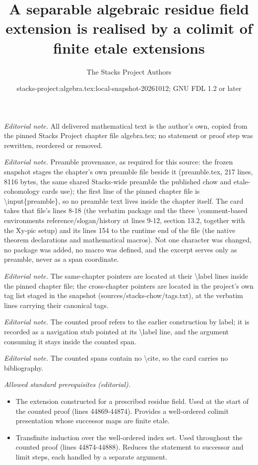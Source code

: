 \documentclass[10pt,a4paper]{amsart}
\title{A separable algebraic residue field extension is realised by a colimit of finite etale extensions}
\author{The Stacks Project Authors}
\date{stacks-project:algebra.tex:local-snapshot-20261012; GNU FDL 1.2 or later}
\theoremstyle{plain}
\theoremstyle{definition}
\theoremstyle{remark}
\numberwithin{equation}{subsection}
\begin{document}
\maketitle
\noindent\textit{Editorial note.} All delivered mathematical text is the author's own, copied from the pinned Stacks Project chapter file algebra.tex; no statement or proof step was rewritten, reordered or removed.\par\medskip
\noindent\textit{Editorial note.} Preamble provenance, as required for this source: the frozen snapshot stages the chapter's own preamble file beside it (preamble.tex, 217 lines, 8116 bytes, the same shared Stacks-wide preamble the published chow and etale-cohomology cards use); the first line of the pinned chapter file is \textbackslash{}input\{preamble\}, so no preamble text lives inside the chapter itself. The card takes that file's lines 8-18 (the verbatim package and the three \textbackslash{}comment-based environments reference/slogan/history at lines 9-12, section 13.2, together with the Xy-pic setup) and its lines 154 to the runtime end of the file (the native theorem declarations and mathematical macros). Not one character was changed, no package was added, no macro was defined, and the excerpt serves only as preamble, never as a span coordinate.\par\medskip
\noindent\textit{Editorial note.} The same-chapter pointers are located at their \textbackslash{}label lines inside the pinned chapter file; the cross-chapter pointers are located in the project's own tag list staged in the snapshot (sources/stacks-chow/tags.txt), at the verbatim lines carrying their canonical tags.\par\medskip
\noindent\textit{Editorial note.} The counted proof refers to the earlier construction by label; it is recorded as a navigation stub pointed at its \textbackslash{}label line, and the argument consuming it stays inside the counted span.\par\medskip
\noindent\textit{Editorial note.} The counted spans contain no \textbackslash{}cite, so the card carries no bibliography.\par\medskip
\noindent\textit{Allowed standard prerequisites (editorial).}\begin{itemize}
\item The extension constructed for a prescribed residue field. Used at the start of the counted proof (lines 44869-44874). Provides a well-ordered colimit presentation whose successor maps are finite etale.
\item Transfinite induction over the well-ordered index set. Used throughout the counted proof (lines 44874-44888). Reduces the statement to successor and limit steps, each handled by a separate argument.
\end{itemize}\medskip
\end{document}
